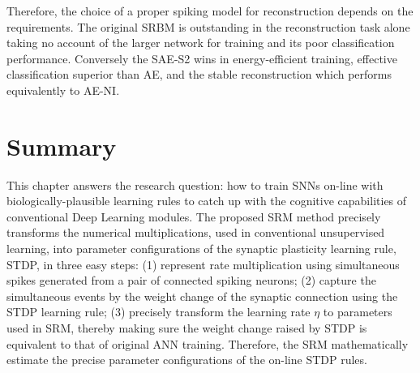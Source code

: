 Therefore, the choice of a proper spiking model for reconstruction depends on the requirements.
The original SRBM is outstanding in the reconstruction task alone taking no account of the larger network for training and its poor classification performance.
Conversely the SAE-S2 wins in energy-efficient training, effective classification superior than AE, and the stable reconstruction which performs equivalently to AE-NI.


\section{Summary}
This chapter answers the research question: how to train SNNs on-line with biologically-plausible learning rules to catch up with the cognitive capabilities of conventional Deep Learning modules.
The proposed SRM method precisely transforms the numerical multiplications, used in conventional unsupervised learning, into parameter configurations of the synaptic plasticity learning rule, STDP, in three easy steps:
(1) represent rate multiplication using simultaneous spikes generated from a pair of connected spiking neurons;
(2) capture the simultaneous events by the weight change of the synaptic connection using the STDP learning rule;
(3) precisely transform the learning rate $\eta$ to parameters used in SRM, thereby making sure the weight change raised by STDP is equivalent to that of original ANN training.
Therefore, the SRM mathematically estimate the precise parameter configurations of the on-line STDP rules.

